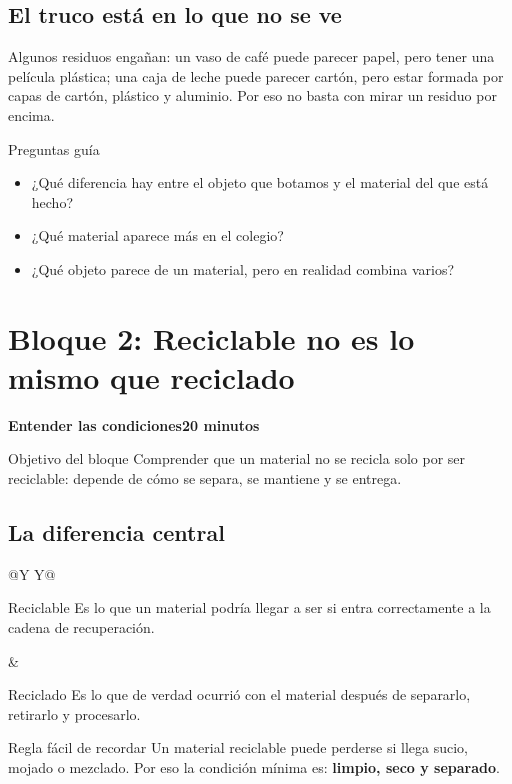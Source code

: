 \documentclass[10pt,a4paper]{article}
\newcommand{\blocktitle}[2]{%
  \vspace{2mm}
  {\large\bfseries\color{AIEPNavy}#1}\hfill{\small\bfseries\textcolor{AIEPRed}{#2}}\par
  \vspace{1mm}
}
\begin{document}
\subsection{El truco está en lo que no se ve}
Algunos residuos engañan: un vaso de café puede parecer papel, pero tener una película plástica; una caja de leche puede parecer cartón, pero estar formada por capas de cartón, plástico y aluminio. Por eso no basta con mirar un residuo por encima.

\begin{infobox}{Preguntas guía}
\begin{itemize}
  \item ¿Qué diferencia hay entre el objeto que botamos y el material del que está hecho?
  \item ¿Qué material aparece más en el colegio?
  \item ¿Qué objeto parece de un material, pero en realidad combina varios?
\end{itemize}
\end{infobox}

\newpage
\section{Bloque 2: Reciclable no es lo mismo que reciclado}
\blocktitle{Entender las condiciones}{20 minutos}

\begin{infobox}{Objetivo del bloque}
Comprender que un material no se recicla solo por ser reciclable: depende de cómo se separa, se mantiene y se entrega.
\end{infobox}

\subsection{La diferencia central}
\begin{tabularx}{\textwidth}{@{}Y Y@{}}
\begin{infobox}[height=31mm]{Reciclable}
Es lo que un material podría llegar a ser si entra correctamente a la cadena de recuperación.
\end{infobox}
&
\begin{infobox}[height=31mm]{Reciclado}
Es lo que de verdad ocurrió con el material después de separarlo, retirarlo y procesarlo.
\end{infobox}
\end{tabularx}

\begin{keybox}{Regla fácil de recordar}
Un material reciclable puede perderse si llega sucio, mojado o mezclado. Por eso la condición mínima es: \textbf{limpio, seco y separado}.
\end{keybox}
\end{document}
